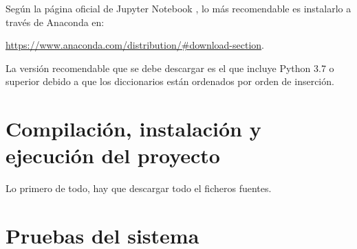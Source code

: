 Según la página oficial de Jupyter Notebook \cite{noauthor_project_nodate}, lo más recomendable es instalarlo a través de Anaconda en:

\href{https://www.anaconda.com/distribution/\#download-section}{https://www.anaconda.com/distribution/\#download-section}.

La versión recomendable que se debe descargar es el que incluye Python 3.7 o superior debido a que los diccionarios están ordenados por orden de inserción.

\section{Compilación, instalación y ejecución del proyecto}

Lo primero de todo, hay que descargar todo el ficheros fuentes.




\section{Pruebas del sistema}

